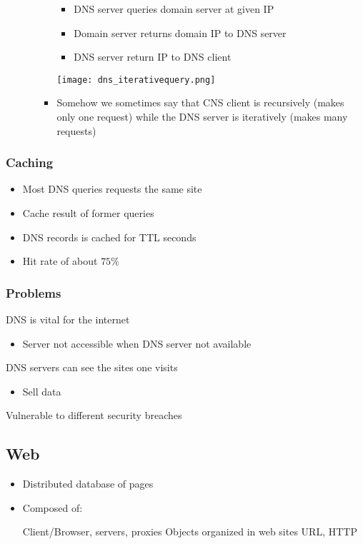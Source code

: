 \begin{itemize}
\begin{itemize}
\begin{itemize}
\begin{itemize}
                            \item DNS server queries domain server at given IP
                            \item Domain server returns domain IP to DNS server
                            \item DNS server return IP to DNS client
                        \end{itemize}
                    \texttt{[image: dns\_iterativequery.png]}
                    \item Somehow we sometimes say that CNS client is recursively (makes only one request) while the DNS server is iteratively (makes many requests)
                \end{itemize}
        \end{itemize}
\end{itemize}

\subsubsection{Caching}
\begin{itemize}
    \item Most DNS queries requests the same site
    \item Cache result of former queries
    \item DNS records is cached for TTL seconds
    \item Hit rate of about $75\%$
\end{itemize}

\subsubsection{Problems}
\begin{itemize}
    \icon DNS is vital for the internet
        \begin{itemize}
            \item Server not accessible when DNS server not available
        \end{itemize}
    \icon DNS servers can see the sites one visits
        \begin{itemize}
            \item Sell data
        \end{itemize}
    \icon Vulnerable to different security breaches
\end{itemize}

\subsection{Web}
\begin{itemize}
    \item Distributed database of pages
    \item Composed of:
        \begin{itemize}
             Client/Browser, servers, proxies
             Objects organized in web sites
             URL, HTTP
        \end{itemize}
\end{itemize}

